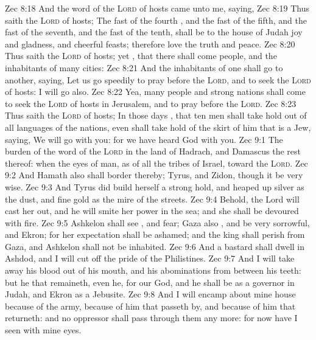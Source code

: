 \vs Zec 8:18 And the word of the \textsc{Lord} of hosts came unto me, saying,
\vs Zec 8:19 Thus saith the \textsc{Lord} of hosts; The fast of the fourth , and the fast of the fifth, and the fast of the seventh, and the fast of the tenth, shall be to the house of Judah joy and gladness, and cheerful feasts; therefore love the truth and peace.
\vs Zec 8:20 Thus saith the \textsc{Lord} of hosts;  yet , that there shall come people, and the inhabitants of many cities:
\vs Zec 8:21 And the inhabitants of one  shall go to another, saying, Let us go speedily to pray before the \textsc{Lord}, and to seek the \textsc{Lord} of hosts: I will go also.
\vs Zec 8:22 Yea, many people and strong nations shall come to seek the \textsc{Lord} of hosts in Jerusalem, and to pray before the \textsc{Lord}.
\vs Zec 8:23 Thus saith the \textsc{Lord} of hosts; In those days , that ten men shall take hold out of all languages of the nations, even shall take hold of the skirt of him that is a Jew, saying, We will go with you: for we have heard  God  with you.
\vs Zec 9:1 The burden of the word of the \textsc{Lord} in the land of Hadrach, and Damascus  the rest thereof: when the eyes of man, as of all the tribes of Israel,  toward the \textsc{Lord}.
\vs Zec 9:2 And Hamath also shall border thereby; Tyrus, and Zidon, though it be very wise.
\vs Zec 9:3 And Tyrus did build herself a strong hold, and heaped up silver as the dust, and fine gold as the mire of the streets.
\vs Zec 9:4 Behold, the Lord will cast her out, and he will smite her power in the sea; and she shall be devoured with fire.
\vs Zec 9:5 Ashkelon shall see , and fear; Gaza also , and be very sorrowful, and Ekron; for her expectation shall be ashamed; and the king shall perish from Gaza, and Ashkelon shall not be inhabited.
\vs Zec 9:6 And a bastard shall dwell in Ashdod, and I will cut off the pride of the Philistines.
\vs Zec 9:7 And I will take away his blood out of his mouth, and his abominations from between his teeth: but he that remaineth, even he,  for our God, and he shall be as a governor in Judah, and Ekron as a Jebusite.
\vs Zec 9:8 And I will encamp about mine house because of the army, because of him that passeth by, and because of him that returneth: and no oppressor shall pass through them any more: for now have I seen with mine eyes.
